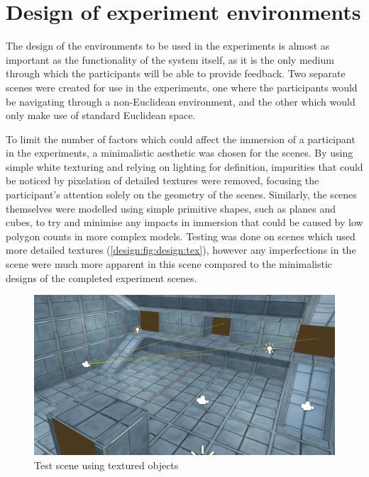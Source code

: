 	\section[Environment Design]{Design of experiment environments}
	\label{design:design}

		The design of the environments to be used in the experiments is almost as important as the functionality of the system itself, as it is the only medium through which the participants will be able to provide feedback.
		Two separate scenes were created for use in the experiments, one where the participants would be navigating through a non-Euclidean environment, and the other which would only make use of standard Euclidean space. %

		To limit the number of factors which could affect the immersion of a participant in the experiments, a minimalistic aesthetic was chosen for the scenes.
		By using simple white texturing and relying on lighting for definition, impurities that could be noticed by pixelation of detailed textures were removed, focusing the participant's attention solely on the geometry of the scenes.
		Similarly, the scenes themselves were modelled using simple primitive shapes, such as planes and cubes, to try and minimise any impacts in immersion that could be caused by low polygon counts in more complex models.
		Testing was done on scenes which used more detailed textures (\autoref{design:fig:design:tex}), however any imperfections in the scene were much more apparent in this scene compared to the minimalistic designs of the completed experiment scenes.

		\begin{figure}[h]
			\includegraphics[width=1\textwidth]{Images/Lines_Everywhere}
			\centering
			\caption{Test scene using textured objects}
			\label{design:fig:design:tex}
		\end{figure}

